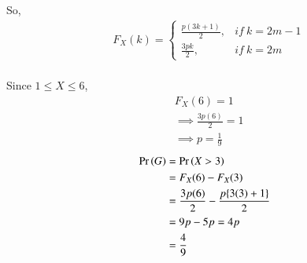 \documentclass[journal,12pt,twocolumn]{IEEEtran}
\begin{document}
So,
\begin{align}
&F_X (k)= \begin{cases} 
      \frac{p(3k+1)}{2}, & if\ k=2m-1 \\
      \frac{3pk}{2}, & if\ k=2m 
   \end{cases}
\end{align}\\
Since $1\leq X \leq6$,
\begin{align}
&F_X (6) = 1\\
&\implies \frac{3p(6)}{2} = 1\\
&\implies p = \frac{1}{9}
\end{align}
\begin{align}
  \Pr\left(G\right) &= \Pr\left(X>3\right)\\
  &=F_X (6) - F_X (3)\\
  &=\frac{3p(6)}{2} - \frac{p\{3(3)+1\}}{2}\\
  &= 9p - 5p = 4p\\
  &= \frac{4}{9}
  \end{align}
\end{document}
